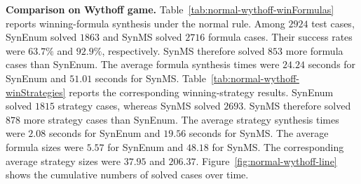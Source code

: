 \documentclass[review]{elsarticle}
\begin{document}
{\color{red}
\textbf{Comparison on Wythoff game.}
Table~\ref{tab:normal-wythoff-winFormulas} reports winning-formula synthesis under the normal rule.
Among $2924$ test cases, SynEnum solved $1863$ and SynMS solved $2716$ formula cases.
Their success rates were $63.7\%$ and $92.9\%$, respectively.
SynMS therefore solved $853$ more formula cases than SynEnum.
The average formula synthesis times were $24.24$ seconds for SynEnum and $51.01$ seconds for SynMS.
Table~\ref{tab:normal-wythoff-winStrategies} reports the corresponding winning-strategy results.
SynEnum solved $1815$ strategy cases, whereas SynMS solved $2693$.
SynMS therefore solved $878$ more strategy cases than SynEnum.
The average strategy synthesis times were $2.08$ seconds for SynEnum and $19.56$ seconds for SynMS.
The average formula sizes were $5.57$ for SynEnum and $48.18$ for SynMS.
The corresponding average strategy sizes were $37.95$ and $206.37$.
Figure~\ref{fig:normal-wythoff-line} shows the cumulative numbers of solved cases over time.
}
\end{document}
